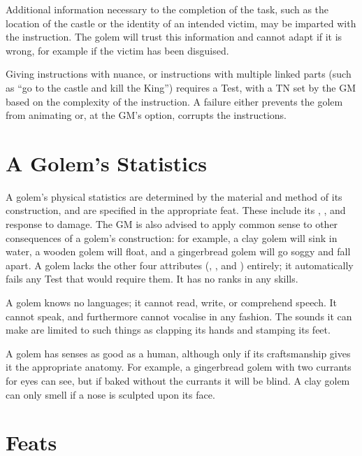 Additional information necessary to the completion of the task, such as the location of the castle or the identity of an intended victim, may be imparted with the instruction.
The golem will trust this information and cannot adapt if it is wrong, for example if the victim has been disguised.

Giving instructions with nuance, or instructions with multiple linked parts (such as ``go to the castle and kill the King'') requires a Test, with a TN set by the GM based on the complexity of the instruction.
A failure either prevents the golem from animating or, at the GM's option, corrupts the instructions.

\section{A Golem's Statistics}

A golem's physical statistics are determined by the material and method of its construction, and are specified in the appropriate feat.
These include its , , and response to damage.
The GM is also advised to apply common sense to other consequences of a golem's construction: for example, a clay golem will sink in water, a wooden golem will float, and a gingerbread golem will go soggy and fall apart.
A golem lacks the other four attributes (, ,  and ) entirely; it automatically fails any Test that would require them.
It has no ranks in any skills.

A golem knows no languages; it cannot read, write, or comprehend speech.
It cannot speak, and furthermore cannot vocalise in any fashion.
The sounds it can make are limited to such things as clapping its hands and stamping its feet.

A golem has senses as good as a human, although only if its craftsmanship gives it the appropriate anatomy.
For example, a gingerbread golem with two currants for eyes can see, but if baked without the currants it will be blind.
A clay golem can only smell if a nose is sculpted upon its face.

\section{Feats}

